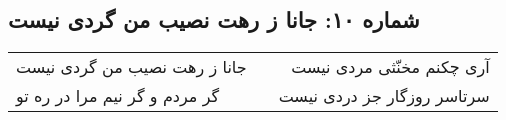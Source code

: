 \begin{center}
\section*{شماره ۱۰: جانا ز رهت نصیب من گردی نیست}
\label{sec:010}
\begin{longtable}{l p{0.5cm} r}
جانا ز رهت نصیب من گردی نیست
&&
آری چکنم مخنّثی مردی نیست
\\
گر مردم و گر نیم مرا در ره تو
&&
سرتاسر روزگار جز دردی نیست
\\
\end{longtable}
\end{center}
